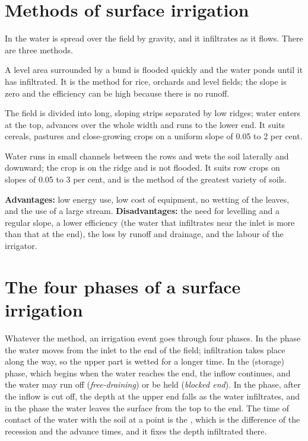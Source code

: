 \section{Methods of surface irrigation}
In  the water is spread over the field by gravity, and it infiltrates as it flows. There are three methods.
\begin{exlist}
\item {} A level area surrounded by a bund is flooded quickly and the water ponds until it has infiltrated. It is the method for rice, orchards and level fields; the slope is zero and the efficiency can be high because there is no runoff.
\item {} The field is divided into long, sloping strips separated by low ridges; water enters at the top, advances over the whole width and runs to the lower end. It suits cereals, pastures and close-growing crops on a uniform slope of 0.05 to 2 per cent.
\item {} Water runs in small channels between the rows and wets the soil laterally and downward; the crop is on the ridge and is not flooded. It suits row crops on slopes of 0.05 to 3 per cent, and is the method of the greatest variety of soils.
\end{exlist}
\noindent \textbf{Advantages:} low energy use, low cost of equipment, no wetting of the leaves, and the use of a large stream. \textbf{Disadvantages:} the need for levelling and a regular slope, a lower efficiency (the water that infiltrates near the inlet is more than that at the end), the loss by runoff and drainage, and the labour of the irrigator.

\section{The four phases of a surface irrigation}
Whatever the method, an irrigation event goes through four phases. In the  phase the water moves from the inlet to the end of the field; infiltration takes place along the way, so the upper part is wetted for a longer time. In the  (storage) phase, which begins when the water reaches the end, the inflow continues, and the water may run off (\emph{free-draining}) or be held (\emph{blocked end}). In the  phase, after the inflow is cut off, the depth at the upper end falls as the water infiltrates, and in the  phase the water leaves the surface from the top to the end. The time of contact of the water with the soil at a point is the , which is the difference of the recession and the advance times, and it fixes the depth infiltrated there.


